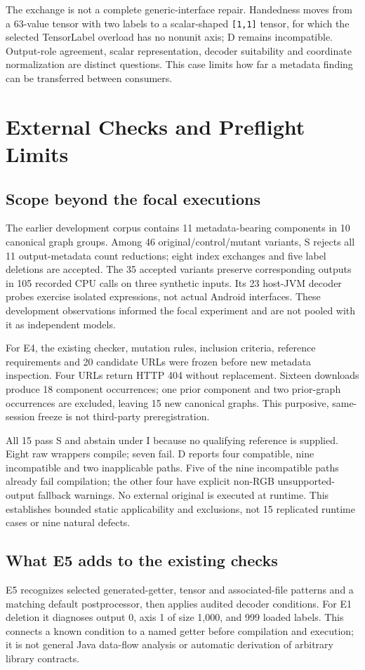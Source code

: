 \documentclass[10pt,twocolumn,letterpaper]{article}
\newcommand{\code}[1]{\texttt{#1}}
\begin{document}
The exchange is not a complete generic-interface repair. Handedness moves from a 63-value tensor with two labels to a scalar-shaped \code{[1,1]} tensor, for which the selected TensorLabel overload has no nonunit axis; D remains incompatible. Output-role agreement, scalar representation, decoder suitability and coordinate normalization are distinct questions. This case limits how far a metadata finding can be transferred between consumers.

\section{External Checks and Preflight Limits}
\label{sec:preflight}
\subsection{Scope beyond the focal executions}
The earlier development corpus contains 11 metadata-bearing components in 10 canonical graph groups. Among 46 original/control/mutant variants, S rejects all 11 output-metadata count reductions; eight index exchanges and five label deletions are accepted. The 35 accepted variants preserve corresponding outputs in 105 recorded CPU calls on three synthetic inputs. Its 23 host-JVM decoder probes exercise isolated expressions, not actual Android interfaces. These development observations informed the focal experiment and are not pooled with it as independent models.

For E4, the existing checker, mutation rules, inclusion criteria, reference requirements and 20 candidate URLs were frozen before new metadata inspection. Four URLs return HTTP 404 without replacement. Sixteen downloads produce 18 component occurrences; one prior component and two prior-graph occurrences are excluded, leaving 15 new canonical graphs. This purposive, same-session freeze is not third-party preregistration.

All 15 pass S and abstain under I because no qualifying reference is supplied. Eight raw wrappers compile; seven fail. D reports four compatible, nine incompatible and two inapplicable paths. Five of the nine incompatible paths already fail compilation; the other four have explicit non-RGB unsupported-output fallback warnings. No external original is executed at runtime. This establishes bounded static applicability and exclusions, not 15 replicated runtime cases or nine natural defects.

\subsection{What E5 adds to the existing checks}
E5 recognizes selected generated-getter, tensor and associated-file patterns and a matching default postprocessor, then applies audited decoder conditions. For E1 deletion it diagnoses output 0, axis 1 of size 1,000, and 999 loaded labels. This connects a known condition to a named getter before compilation and execution; it is not general Java data-flow analysis or automatic derivation of arbitrary library contracts.
\end{document}
